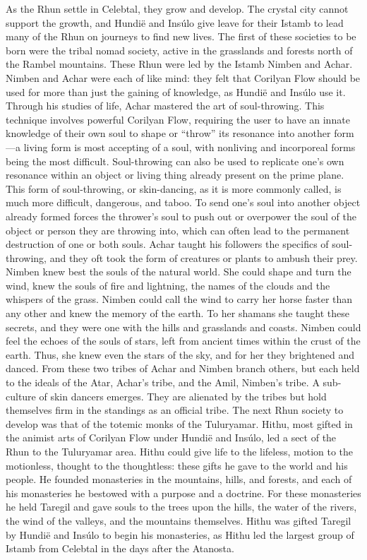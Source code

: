 \documentclass[smalldemyvopaper,11pt,twoside,onecolumn,openright,extrafontsizes]{memoir}
\begin{document}
	As the Rhun settle in Celebtal, they grow and develop. The crystal city cannot support the growth, and Hundië and Insúlo give leave for their Istamb to lead many of the Rhun on journeys to find new lives. The first of these societies to be born were the tribal nomad society, active in the grasslands and forests north of the Rambel mountains.
These Rhun were led by the Istamb Nimben and Achar. Nimben and Achar were each of like mind: they felt that Corilyan Flow should be used for more than just the gaining of knowledge, as Hundië and Insúlo use it. Through his studies of life, Achar mastered the art of soul-throwing. This technique involves powerful Corilyan Flow, requiring the user to have an innate knowledge of their own soul to shape or “throw” its resonance into another form—a living form is most accepting of a soul, with nonliving and incorporeal forms being the most difficult. Soul-throwing can also be used to replicate one’s own resonance within an object or living thing already present on the prime plane. This form of soul-throwing, or skin-dancing, as it is more commonly called, is much more difficult, dangerous, and taboo. To send one’s soul into another object already formed forces the thrower’s soul to push out or overpower the soul of the object or person they are throwing into, which can often lead to the permanent destruction of one or both souls. Achar taught his followers the specifics of soul-throwing, and they oft took the form of creatures or plants to ambush their prey. Nimben knew best the souls of the natural world. She could shape and turn the wind, knew the souls of fire and lightning, the names of the clouds and the whispers of the grass. Nimben could call the wind to carry her horse faster than any other and knew the memory of the earth. To her shamans she taught these secrets, and they were one with the hills and grasslands and coasts. Nimben could feel the echoes of the souls of stars, left from ancient times within the crust of the earth. Thus, she knew even the stars of the sky, and for her they brightened and danced.
From these two tribes of Achar and Nimben branch others, but each held to the ideals of the Atar, Achar’s tribe, and the Amil, Nimben’s tribe. A sub-culture of skin dancers emerges. They are alienated by the tribes but hold themselves firm in the standings as an official tribe.
The next Rhun society to develop was that of the totemic monks of the Tuluryamar. Hithu, most gifted in the animist arts of Corilyan Flow under Hundië and Insúlo, led a sect of the Rhun to the Tuluryamar area. Hithu could give life to the lifeless, motion to the motionless, thought to the thoughtless: these gifts he gave to the world and his people. He founded monasteries in the mountains, hills, and forests, and each of his monasteries he bestowed with a purpose and a doctrine. For these monasteries he held Taregil and gave souls to the trees upon the hills, the water of the rivers, the wind of the valleys, and the mountains themselves. Hithu was gifted Taregil by Hundië and Insúlo to begin his monasteries, as Hithu led the largest group of Istamb from Celebtal in the days after the Atanosta.
\end{document}
